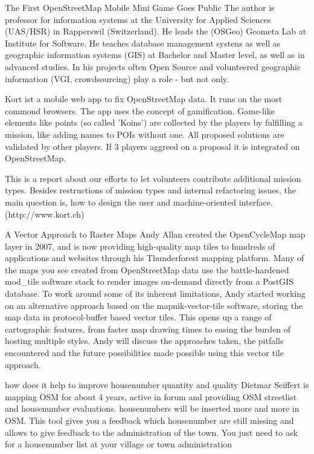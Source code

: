 %
{The First OpenStreetMap Mobile Mini Game Goes Public}%
{The author is professor for information systems at the University for Applied Sciences (UAS/HSR) in Rapperswil (Switzerland). He leads the (OSGeo) Geometa Lab at Institute for Software. He teaches database management systens as well as geographic information systems (GIS) at Bachelor and Master level, as well as in advanced studies. In his projects often Open Source and volunteered geographic information (VGI, crowdsourcing) play a role - but not only. }%
{Kort ist a mobile web app to fix OpenStreetMap data. It runs on the most commond browsers. The app uses the concept of gamification. Game-like elements like points (so called 'Koins') are collected by the players by fulfilling a mission, like adding names to POIs without one. All proposed solutions are validated by other players. If 3 players aggreed on a proposal it is integrated on OpenStreetMap.

This is a report about our efforts to let volunteers contribute additional mission types. Besides restructions of mission types and internal refactoring issues, the main question is, how to design the user and machine-oriented interface. (http://www.kort.ch)}


%
{A Vector Approach to Raster Maps}%
{Andy Allan created the OpenCycleMap map layer in 2007, and is now providing high-quality map tiles to hundreds of applications and websites through his Thunderforest mapping platform. }%
{Many of the maps you see created from OpenStreetMap data use the battle-hardened mod\_tile software stack to render images on-demand directly from a PostGIS database. To work around some of its inherent limitations, Andy started working on an alternative  approach based on the mapnik-vector-tile software, storing the map data in protocol-buffer based vector tiles. This opens up a range of cartographic features, from faster map drawing times to easing the burden of hosting multiple styles. Andy will discuss the approaches taken, the pitfalls encountered and the future possibilities made possible using this vector tile approach.}


%
{how does it help to improve housenumber quantity and quality}%
{Dietmar Seiffert is mapping OSM for about 4 years, active in forum and providing OSM streetlist and housenumber evaluations.}%
{housenumbers will be inserted more and more in OSM. This tool gives you a feedback which housenumber are still missing and allows to give feedback to the administration of the town. You just need to ask for a housenumber list at your village or town administration}

